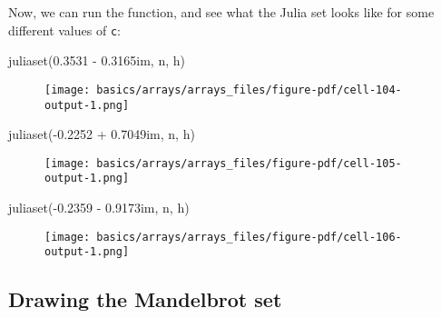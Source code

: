 \documentclass[
  letterpaper,
  DIV=11,
  numbers=noendperiod]{scrreprt}
\newenvironment{Shaded}{\begin{snugshade}}{\end{snugshade}}
\newcommand{\FloatTok}[1]{\textcolor[rgb]{0.68,0.00,0.00}{#1}}
\newcommand{\FunctionTok}[1]{\textcolor[rgb]{0.28,0.35,0.67}{#1}}
\newcommand{\NormalTok}[1]{\textcolor[rgb]{0.00,0.23,0.31}{#1}}
\newcommand{\OperatorTok}[1]{\textcolor[rgb]{0.37,0.37,0.37}{#1}}
\begin{document}
Now, we can run the function, and see what the Julia set looks like for
some different values of \texttt{c}:

\begin{Shaded}
\begin{Highlighting}[]
\FunctionTok{juliaset}\NormalTok{(}\FloatTok{0.3531} \OperatorTok{{-}} \FloatTok{0.3165im}\NormalTok{, n, h)}
\end{Highlighting}
\end{Shaded}

\begin{figure}[H]

{\centering \texttt{[image: basics/arrays/arrays\_files/figure-pdf/cell-104-output-1.png]}

}

\end{figure}

\begin{Shaded}
\begin{Highlighting}[]
\FunctionTok{juliaset}\NormalTok{(}\OperatorTok{{-}}\FloatTok{0.2252} \OperatorTok{+} \FloatTok{0.7049im}\NormalTok{, n, h)}
\end{Highlighting}
\end{Shaded}

\begin{figure}[H]

{\centering \texttt{[image: basics/arrays/arrays\_files/figure-pdf/cell-105-output-1.png]}

}

\end{figure}

\begin{Shaded}
\begin{Highlighting}[]
\FunctionTok{juliaset}\NormalTok{(}\OperatorTok{{-}}\FloatTok{0.2359} \OperatorTok{{-}} \FloatTok{0.9173im}\NormalTok{, n, h)}
\end{Highlighting}
\end{Shaded}

\begin{figure}[H]

{\centering \texttt{[image: basics/arrays/arrays\_files/figure-pdf/cell-106-output-1.png]}

}

\end{figure}

\hypertarget{drawing-the-mandelbrot-set}{%
\subsection{Drawing the Mandelbrot
set}\label{drawing-the-mandelbrot-set}}
\end{document}

